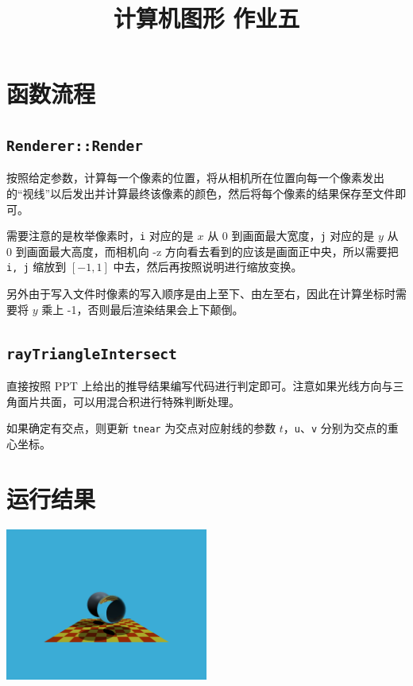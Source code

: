 \documentclass{ctexart}
\title{计算机图形 作业五}
\author{\theauthor}
\begin{document}
    \maketitle

    \section{函数流程}

    \subsection{\texttt{Renderer::Render}}

    按照给定参数，计算每一个像素的位置，将从相机所在位置向每一个像素发出的``视线''以后发出并计算最终该像素的颜色，然后将每个像素的结果保存至文件即可。

    需要注意的是枚举像素时，\texttt{i} 对应的是 $x$ 从 0 到画面最大宽度，\texttt{j} 对应的是 $y$ 从 0 到画面最大高度，而相机向 -z 方向看去看到的应该是画面正中央，所以需要把 \texttt{i, j} 缩放到 $[-1, 1]$ 中去，然后再按照说明进行缩放变换。

    另外由于写入文件时像素的写入顺序是由上至下、由左至右，因此在计算坐标时需要将 $y$ 乘上 -1，否则最后渲染结果会上下颠倒。

    \subsection{\texttt{rayTriangleIntersect}}

    直接按照 PPT 上给出的推导结果编写代码进行判定即可。注意如果光线方向与三角面片共面，可以用混合积进行特殊判断处理。

    如果确定有交点，则更新 \texttt{tnear} 为交点对应射线的参数 $t$，\texttt{u}、\texttt{v} 分别为交点的重心坐标。

    \section{运行结果}

    \begin{center}
        \includegraphics[width=0.5\textwidth]{img/res.png}
    \end{center}
\end{document}
